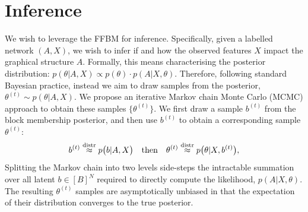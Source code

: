 \section{Inference}
\label{sec:inference}

We wish to leverage the FFBM for inference. Specifically, given a labelled network $(A, X)$, we wish to infer if and how the observed features $X$ impact the graphical structure $A$. Formally,
this means characterising the posterior distribution:
$
p(\theta|A, X) \propto p(\theta) \cdot p(A | X, \theta).
$
Therefore, following standard Bayesian practice,
instead we aim to draw samples from the posterior,
$
	\label{eqn:theta-target}
	\theta^{(t)} \sim p(\theta | A, X).
$
We propose an iterative Markov chain Monte Carlo
(MCMC) approach to obtain these samples
$\{\theta^{(t)}\}$. We first draw a sample $b^{(t)}$ 
from the block membership posterior,
and then use $b^{(t)}$ to obtain a corresponding
sample $\theta^{(t)}$:
%
\begin{equation}
	b^{(t)} \stackrel{\rm distr}{\approx} p \big( b | A, X \big) 
	\quad \textrm{then} \quad
	\theta^{(t)} \stackrel{\rm distr}{\approx} 
	p\big(\theta | X, b^{(t)} \big),
\end{equation}
%
Splitting the Markov chain into two levels side-steps the intractable summation over
all latent $b \in [B]^N$ required to directly compute the likelihood, $p(A| X, \theta)$.
The resulting $\theta^{(t)}$ samples are asymptotically
unbiased in that the expectation of 
their distribution converges to the true posterior.
%
